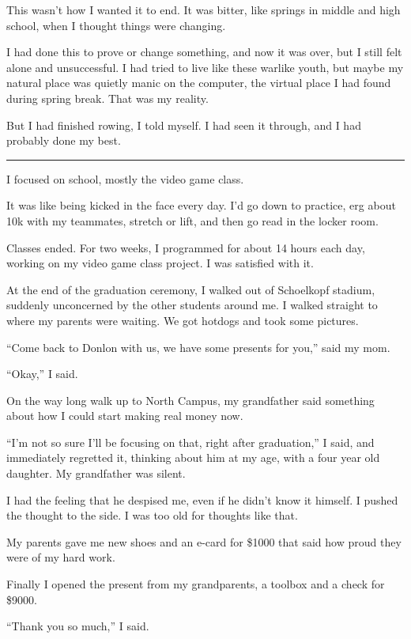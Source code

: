 This wasn't how I wanted it to end.  It was bitter, like springs in middle and
high school, when I thought things were changing.  

I had done this to prove or change something, and now it was over, but I still
felt alone and unsuccessful.  I had tried to live like these warlike youth, but
maybe my natural place was quietly manic on the computer, the virtual place I
had found during spring break.  That was my reality.

But I had finished rowing, I told myself.  I had seen it through, and I had
probably done my best.

\plainfancybreak{12pt}{2}{* * *}

I focused on school, mostly the video game class.

It was like being kicked in the face every day.  I'd go down to practice, erg
about 10k with my teammates, stretch or lift, and then go read in the locker
room.

Classes ended.  For two weeks, I programmed for about 14 hours each day, working
on my video game class project.  I was satisfied with it.

At the end of the graduation ceremony, I walked out of Schoelkopf stadium,
suddenly unconcerned by the other students around me.  I walked straight to
where my parents were waiting.  We got hotdogs and took some pictures.  

``Come back to Donlon with us, we have some presents for you,'' said my mom. 

``Okay,'' I said.  

On the way long walk up to North Campus, my grandfather said something about how
I could start making real money now.

``I'm not so sure I'll be focusing on that, right after graduation,'' I said,
and immediately regretted it, thinking about him at my age, with a four year old
daughter.  My grandfather was silent.  

I had the feeling that he despised me, even if he didn't know it himself.  I
pushed the thought to the side.  I was too old for thoughts like that.

My parents gave me new shoes and an e-card for \$1000 that said how proud they
were of my hard work.  

Finally I opened the present from my grandparents, a toolbox and a check for \$9000.  

``Thank you so much,'' I said.
